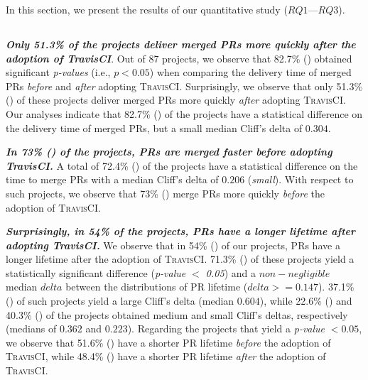 In this section, we present the results of our quantitative study ($RQ1$---$RQ3$).

\subsection*{\textbf{\RQone}}
\label{RQ1_results}

\textit{\textbf{Only 51.3\% of the projects deliver merged PRs more quickly \textit{after} the adoption of TravisCI}}.  Out of 87 projects, we observe that
82.7\% () obtained significant \textit{p-values} (i.e., $p<0.05$) when comparing the delivery time of merged PRs {\em before} and {\em after} adopting \textsc{TravisCI}. Surprisingly, we observe that only 51.3\% () of these projects deliver merged PRs more quickly {\em after} adopting \textsc{TravisCI}. 
Our analyses indicate that 82.7\% () of the projects have a statistical difference on the
delivery time of merged PRs, but a small median Cliff's delta of $0.304$.                                     

\textit{\textbf{In 73\% () of the projects, PRs are merged faster \textit{before} adopting TravisCI.}} A total of 72.4\% () of the projects have a statistical difference on the time to merge PRs with a median Cliff's delta of $0.206$ (\textit{small}). With respect to such
projects, we observe that 73\% () merge PRs more quickly \textit{before} the adoption of \textsc{TravisCI}. 

\textit{\textbf{Surprisingly, in 54\% of the projects, PRs have a longer lifetime after adopting TravisCI.}}
We observe that in 54\% () of our projects, PRs have a longer lifetime after the adoption of \textsc{TravisCI}. 71.3\% () of these projects yield a statistically significant difference (\textit{p-value $<$ 0.05}) and a
$non-negligible$ median $delta$ between the distributions of PR lifetime
($delta>=0.147$). 37.1\% () of such projects yield a large Cliff's delta (median $0.604$), while 22.6\% () and 40.3\%
() of the projects obtained medium and small Cliff's deltas, respectively (medians of $0.362$ and $0.223$).
Regarding the projects that yield a \textit{p-value} $< 0.05$, we observe that 51.6\% () have a shorter PR lifetime \textit{before} the adoption of \textsc{TravisCI}, while 48.4\% () have a shorter PR lifetime \textit{after} the adoption of \textsc{TravisCI}. 


